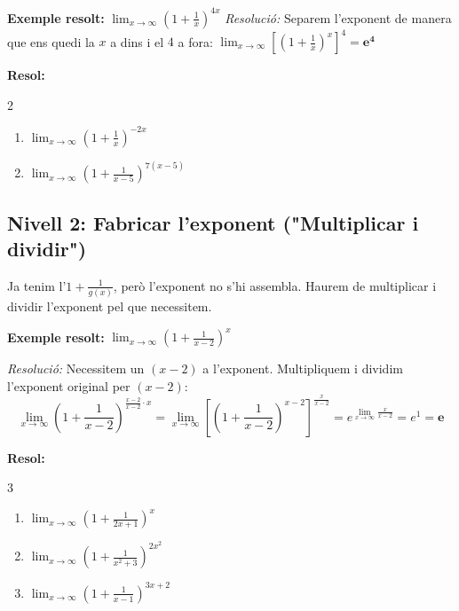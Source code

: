 \documentclass[12pt,a4paper]{article}
\begin{document}
\textbf{Exemple resolt:} $\displaystyle \lim_{x \to \infty} \left( 1 + \frac{1}{x} \right)^{4x}$
\textit{Resolució:} Separem l'exponent de manera que ens quedi la $x$ a dins i el $4$ a fora: 
$\displaystyle \lim_{x \to \infty} \left[ \left( 1 + \frac{1}{x} \right)^x \right]^4 = \mathbf{e^4}$


\textbf{Resol:}
\begin{multicols}{2}
\begin{enumerate}[label=3.1.\arabic*.]
    \item $\displaystyle \lim_{x \to \infty} \left( 1 + \frac{1}{x} \right)^{-2x}$
    \item $\displaystyle \lim_{x \to \infty} \left( 1 + \frac{1}{x-5} \right)^{7(x-5)}$
\end{enumerate}
\end{multicols}

\vspace{0.4cm}

\subsection*{Nivell 2: Fabricar l'exponent ("Multiplicar i dividir")}
Ja tenim l'$1 + \frac{1}{g(x)}$, però l'exponent no s'hi assembla. Haurem de multiplicar i dividir l'exponent pel que necessitem.

\textbf{Exemple resolt:} $\displaystyle \lim_{x \to \infty} \left( 1 + \frac{1}{x-2} \right)^x$

\textit{Resolució:} Necessitem un $(x-2)$ a l'exponent. Multipliquem i dividim l'exponent original per $(x-2)$:
\[ \lim_{x \to \infty} \left( 1 + \frac{1}{x-2} \right)^{ \frac{x-2}{x-2} \cdot x } = \lim_{x \to \infty} \left[ \left( 1 + \frac{1}{x-2} \right)^{x-2} \right]^{\frac{x}{x-2}} = e^{\displaystyle \lim_{x \to \infty} \frac{x}{x-2}} = e^1 = \mathbf{e} \]




\textbf{Resol:}
\begin{multicols}{3}
\begin{enumerate}[label=3.2.\arabic*.]
    \item $\displaystyle \lim_{x \to \infty} \left( 1 + \frac{1}{2x+1} \right)^x$
    \item $\displaystyle \lim_{x \to \infty} \left( 1 + \frac{1}{x^2+3} \right)^{2x^2}$
    \item $\displaystyle \lim_{x \to \infty} \left( 1 + \frac{1}{x-1} \right)^{3x+2}$
\end{enumerate}
\end{multicols}
\end{document}
